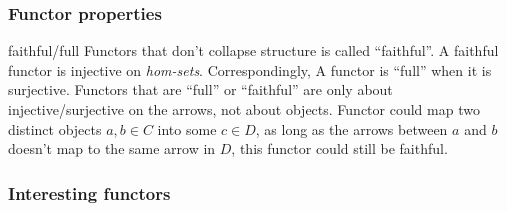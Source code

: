 \subsubsection{Functor properties}

\begin{definition}{faithful/full}
Functors that don't collapse structure is called ``faithful''. A faithful
functor is injective on \emph{hom-sets}. Correspondingly, A functor is ``full'' when it
is surjective. Functors that are ``full'' or ``faithful'' are only about
injective/surjective on the arrows, not about objects. Functor could map two
distinct objects
$a, b\in C$ into some $c \in D$, as long as the arrows between $a$ and $b$
doesn't map to the same arrow in $D$, this functor could still be faithful.
\end{definition}

\newcommand{\singletoncat}{%
\begin{tikzcd}[cramped]
  \cdot \ar[loop]{r}{id}
\end{tikzcd}%
}

\subsubsection{Interesting functors}

